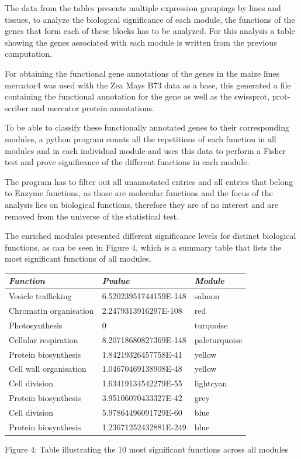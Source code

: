 \documentclass[
]{article}
\begin{document}
The data from the tables presents multiple expression groupings by lines
and tissues, to analyze the biological significance of each module, the
functions of the genes that form each of these blocks has to be
analyzed. For this analysis a table showing the genes associated with
each module is written from the previous computation.

For obtaining the functional gene annotations of the genes in the maize
lines mercator4 was used with the Zea Mays B73 data as a base, this
generated a file containing the functional annotation for the gene as
well as the swissprot, prot-scriber and mercator protein annotations.

To be able to classify these functionally annotated genes to their
corresponding modules, a python program counts all the repetitions of
each function in all modules and in each individual module and uses this
data to perform a Fisher test and prove significance of the different
functions in each module.

The program has to filter out all unannotated entries and all entries
that belong to Enzyme functions, as those are molecular functions and
the focus of the analysis lies on biological functions, therefore they
are of no interest and are removed from the universe of the statistical
test.

The enriched modules presented different significance levels for
distinct biological functions, as can be seen in Figure 4, which is a
summary table that lists the most significant functions of all modules.

\begin{longtable}[]{@{}lll@{}}
\toprule
\emph{Function} & \emph{Pvalue} & \emph{Module}\tabularnewline
\midrule
\endhead
Vesicle trafficking & 6.52023951744159E-148 & salmon\tabularnewline
Chromatin organisation & 2.2479313916297E-108 & red\tabularnewline
Photosynthesis & 0 & turquoise\tabularnewline
Cellular respiration & 8.20718680827369E-148 &
paleturquoise\tabularnewline
Protein biosynthesis & 1.84219326457758E-41 & yellow\tabularnewline
Cell wall organisation & 1.04670469138908E-48 & yellow\tabularnewline
Cell division & 1.63419134542279E-55 & lightcyan\tabularnewline
Protein biosynthesis & 3.95106070433327E-42 & grey\tabularnewline
Cell division & 5.97864496091729E-60 & blue\tabularnewline
Protein biosynthesis & 1.23671252432881E-249 & blue\tabularnewline
\bottomrule
\end{longtable}

Figure 4: Table illustrating the 10 most significant functions across
all modules
\end{document}
